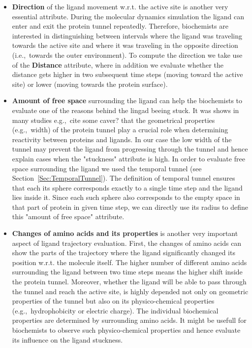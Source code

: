 \documentclass[twocolumn]{bmcart}%
\newcommand{\ie}{i.e.,~}
\newcommand{\eg}{e.g.,~}
\begin{document}
\begin{itemize}
\item \textbf{Direction} of the ligand movement w.r.t. the active site is another very essential attribute. 
During the molecular dynamics simulation the ligand can enter and exit the protein tunnel repeatedly. 
Therefore, biochemists are interested in distinguishing between intervals where the ligand was traveling towards the active site and where it was traveling in the opposite direction (\ie towards the outer environment). 
To compute the direction we take use of the \textbf{Distance} attribute, where in addition we evaluate whether the distance gets higher in two subsequent time steps (moving toward the active site) or lower (moving towards the protein surface). 
   

\item \textbf{Amount of free space} surrounding the ligand can help the biochemists to evaluate one of the reasons behind the lingad beeing stuck. 
It was shows in many studies {\color{red}\eg cite some caver?} that the geometrical properties (\eg width) of the protein tunnel play a crucial role when determining reactivity between proteins and ligands. 
In our case the low width of the tunnel may prevent the ligand from progressing through the tunnel and hence explain cases when the "stuckness" attribute is high. 
In order to evaluate free space surrounding the ligand we used the temporal tunnel (see Section~\ref{Sec:TemporalTunnel}). 
The definition of temporal tunnel ensures that each its sphere corresponds exactly to a single time step and the ligand lies inside it. 
Since each such sphere also corresponds to the empty space in that part of protein in given time step, we can directly use its radius to define this "amount of free space" attribute. 

\item \textbf{Changes of amino acids and its properties} is another very important aspect of ligand trajectory evaluation.
First, the changes of amino acids can show the parts of the trajectory where the ligand  significantly changed its position w.r.t. the molecule itself. 
The higher number of different amino acids surrounding the ligand between two time steps means the higher shift inside the protein tunnel.
Moreover, whether the ligand will be able to pass through the tunnel and reach the active site, is highly depended not only on geometric properties of the tunnel but also on its physico-chemical properties (\eg hydrophobicity or electric charge).
The individual biochemical properties are determined by surrounding amino acids.
It might be usefull for biochemists to observe such physico-chemical properties and hence evaluate its influence on the ligand stuckness.  


\end{itemize}
\end{document}
